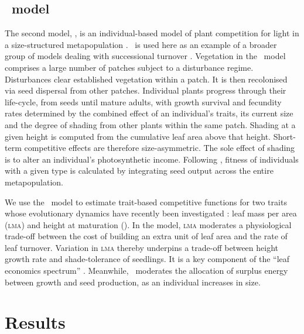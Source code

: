 \documentclass[a4paper,11pt]{article}
\begin{document}
\subsection{\plant\ model}

The second model, \plant, is an individual-based model of plant competition
for light in a size-structured metapopulation \citep{Falster-2016,Falster-2015,Falster-2016}. \plant\ is used here as an example of a broader group
of models dealing with successional turnover
\citep{Huston-1987,Kohyama-1993,Moorcroft-2001,Falster-2011}.
%
Vegetation in the \plant\ model comprises a large number of patches subject
to a disturbance regime.  Disturbances clear established
vegetation within a patch. It is then recolonised via seed
dispersal from other patches.  Individual plants progress through
their life-cycle, from seeds until mature adults, with growth survival
and fecundity rates determined by the combined effect of an
individual's traits, its current size and the degree of shading from
other plants within the same patch. Shading at a given
height is computed from the cumulative leaf area above that height.
Short-term competitive effects are therefore size-asymmetric. The sole
effect of shading is to alter an individual's photosynthetic
income. Following \citep{Falster-2015}, fitness of individuals
with a given type is calculated by integrating seed output across the
entire metapopulation.

We use the \plant\ model to estimate trait-based competitive functions
for two traits whose evolutionary dynamics have recently been
investigated \citep{Falster-2015}: leaf mass per area (\textsc{lma})
and height at maturation (\hmat). In the model, \textsc{lma} moderates
a physiological trade-off between the cost of building an extra unit
of leaf area and the rate of leaf turnover.  Variation in \textsc{lma}
thereby underpins a trade-off between height growth rate and
shade-tolerance of seedlings. It is a key component of the
``leaf economics spectrum'' \citep{Wright-2004}. Meanwhile, \hmat\
moderates the allocation of surplus energy between growth and seed
production, as an individual increases in size.

\section{Results}

%
\end{document}
